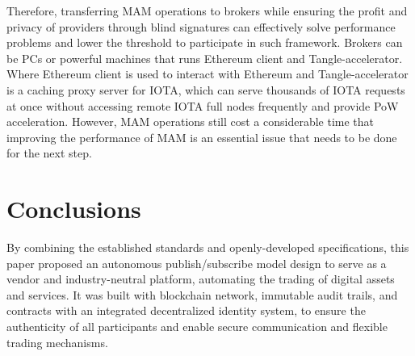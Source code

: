 \documentclass[conference]{IEEEtran}
\begin{document}
Therefore, transferring MAM operations to brokers while ensuring the profit and privacy of providers through blind signatures can effectively solve performance problems and lower the threshold to participate in such framework. Brokers can be PCs or powerful machines that runs Ethereum client and Tangle-accelerator\cite{TA}. Where Ethereum client is used to interact with Ethereum and Tangle-accelerator is a caching proxy server for IOTA, which can serve thousands of IOTA requests at once without accessing remote IOTA full nodes frequently and provide PoW acceleration. However, MAM operations still cost a considerable time that improving the performance of MAM is an essential issue that needs to be done for the next step.

\section{Conclusions}
By combining the established standards and openly-developed specifications, this paper proposed an autonomous publish/subscribe model design to serve as a vendor and industry-neutral platform, automating the trading of digital assets and services. It was built with blockchain network, immutable audit trails, and contracts with an integrated decentralized identity system, to ensure the authenticity of all participants and enable secure communication and flexible trading mechanisms.



\end{document}
